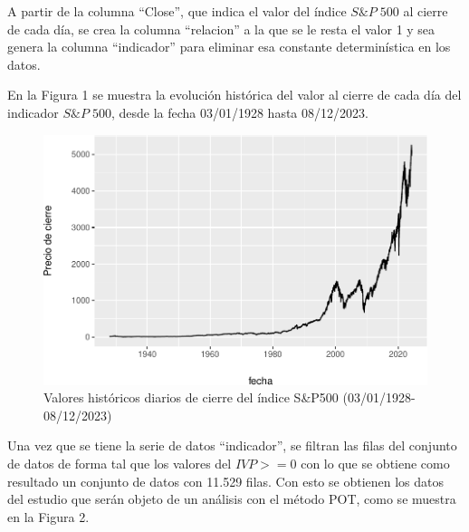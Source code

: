 \documentclass[
  12pt]{article}
\newenvironment{Shaded}{\begin{snugshade}}{\end{snugshade}}
\newcommand{\AttributeTok}[1]{\textcolor[rgb]{0.13,0.29,0.53}{#1}}
\newcommand{\DecValTok}[1]{\textcolor[rgb]{0.00,0.00,0.81}{#1}}
\newcommand{\FunctionTok}[1]{\textcolor[rgb]{0.13,0.29,0.53}{\textbf{#1}}}
\newcommand{\NormalTok}[1]{#1}
\newcommand{\OtherTok}[1]{\textcolor[rgb]{0.56,0.35,0.01}{#1}}
\newcommand{\SpecialCharTok}[1]{\textcolor[rgb]{0.81,0.36,0.00}{\textbf{#1}}}
\begin{document}
A partir de la columna ``Close'', que indica el valor del índice
\(S\&P\;500\) al cierre de cada día, se crea la columna ``relacion'' a
la que se le resta el valor 1 y sea genera la columna ``indicador'' para
eliminar esa constante determinística en los datos.

\begin{Shaded}
\end{Shaded}

En la Figura 1 se muestra la evolución histórica del valor al cierre de
cada día del indicador \(S\&P\;500\), desde la fecha 03/01/1928 hasta
08/12/2023.

\begin{figure}
\centering
\includegraphics{Entrega_files/figure-latex/fig1-1.pdf}
\caption{Valores históricos diarios de cierre del índice S\&P500
(03/01/1928-08/12/2023)}
\end{figure}

Una vez que se tiene la serie de datos ``indicador'', se filtran las
filas del conjunto de datos de forma tal que los valores del \(IVP>=0\)
con lo que se obtiene como resultado un conjunto de datos con 11.529
filas. Con esto se obtienen los datos del estudio que serán objeto de un
análisis con el método POT, como se muestra en la Figura 2.
\end{document}

